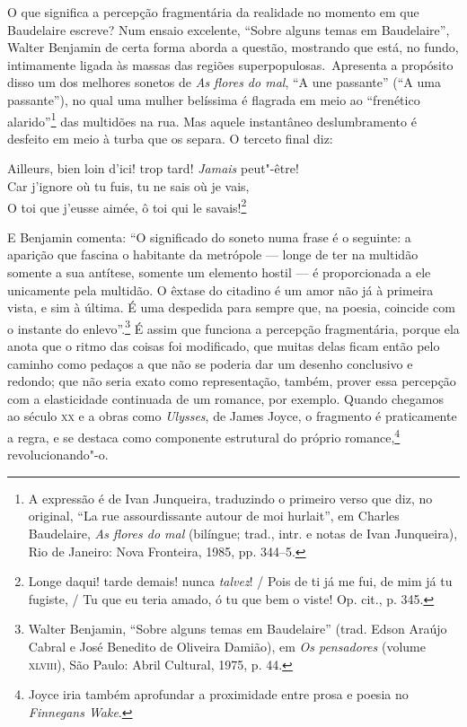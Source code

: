 O que significa a percepção fragmentária da realidade no momento em que
Baudelaire escreve? Num ensaio excelente, “Sobre alguns temas em
Baudelaire”, Walter Benjamin de certa forma aborda a questão, mostrando
que está, no fundo, intimamente ligada às massas das regiões
superpopulosas.~Apresenta a propósito disso um dos melhores sonetos de
\textit{As flores do mal}, “A une passante” (“A uma passante”), no qual uma
 mulher belíssima é flagrada em meio ao “frenético alarido”\footnote{ A
expressão é de Ivan Junqueira, traduzindo o primeiro verso que diz, no
original, “La rue assourdissante autour de moi hurlait”, em
Charles Baudelaire, \textit{As flores do mal} (bilíngue; trad.,
intr. e notas de Ivan Junqueira), Rio de Janeiro: Nova Fronteira,
1985, pp. 344--5.} das multidões na rua. Mas aquele instantâneo
deslumbramento é desfeito em meio à turba que os separa. O terceto
final diz:


\begin{hedraquote}
Ailleurs, bien loin d’ici! trop tard! \textit{Jamais} peut"-être!\\ 
Car j’ignore où tu fuis, tu ne sais où je vais,\\
O toi que j’eusse aimée, ô toi qui le savais!\footnote{
Longe daqui! tarde demais! nunca \textit{talvez}! /
Pois de ti já me fui, de mim já tu fugiste, /
Tu que eu teria amado, ó tu que bem o viste! Op. cit.,
p. 345.}
\end{hedraquote}

E Benjamin comenta: “O significado do soneto numa frase é o seguinte: a
aparição que fascina o habitante da metrópole --- longe de ter na
multidão somente a sua antítese, somente um elemento hostil --- é
proporcionada a ele unicamente pela multidão. O êxtase do citadino é um
amor não já à primeira vista, e sim à última. É uma despedida para
sempre que, na poesia, coincide com o instante do enlevo”.\footnote{
 Walter Benjamin, “Sobre alguns temas em Baudelaire” (trad. Edson
Araújo Cabral e José Benedito de Oliveira Damião), em \textit{Os pensadores}
(volume \textsc{xlviii}), São Paulo: Abril Cultural, 1975, p. 44.} É assim que
funciona a percepção fragmentária, porque ela anota que o ritmo das
coisas foi modificado, que muitas delas ficam então pelo caminho como
pedaços a que não se poderia dar um desenho conclusivo e redondo; que
não seria exato como representação, também, prover essa percepção com a
elasticidade continuada de um romance, por exemplo. Quando chegamos ao
século \textsc{xx} e a obras como \textit{Ulysses}, de James Joyce, o fragmento
é praticamente a regra, e se destaca como componente estrutural do
próprio romance,\footnote{ Joyce iria também aprofundar a proximidade
entre prosa e poesia no \textit{Finnegans Wake}.} revolucionando"-o.

